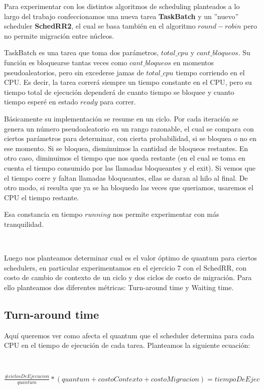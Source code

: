 Para experimentar con los distintos algoritmos de scheduling planteados a lo largo del trabajo confeccionamos una nueva tarea 
\textbf{TaskBatch} y un ''nuevo'' scheduler \textbf{SchedRR2}, el cual se basa también en el algoritmo $round-robin$ pero no permite migración entre núcleos.

TaskBatch es una tarea que toma dos parámetros, $total\_cpu$ y $cant\_bloqueos$. Su función es bloquearse tantas veces como $cant\_bloqueos$ en momentos pseudoaleatorios, pero sin excederse jamas de $total\_cpu$ tiempo corriendo en el CPU. Es decir, la tarea correrá siempre un tiempo constante en el CPU, pero su tiempo total de ejecución dependerá de cuanto tiempo se bloquee y cuanto tiempo esperé en estado $ready$ para correr.

Básicamente su implementación se resume en un ciclo. Por cada iteración se genera un número pseudoaleatorio en un rango razonable, el cual se compara con ciertos parámetros para determinar, con cierta probabilidad, si se bloquea o no en ese momento. Si se bloquea, disminuimos la cantidad de bloqueos restantes. En otro caso, diminuimos el tiempo que nos queda restante (en el cual se toma en cuenta el tiempo consumido por las llamadas bloqueantes y el exit). Si vemos que el tiempo corre y faltan llamadas bloqueantes, ellas se daran al hilo al final. De otro modo, si resulta que ya se ha bloquedo las veces que queriamos, usaremos el CPU el tiempo restante.

Esa constancia en tiempo $running$ nos permite experimentar con más tranquilidad.

~

Luego nos planteamos determinar cual es el valor óptimo de quantum para ciertos schedulers, en particular experimentamos en el ejercicio 7 con el SchedRR, con costo de cambio de contexto de un ciclo y dos ciclos de costo de migración. Para ello planteamos dos diferentes métricas: Turn-around time y Waiting time.

\subsection{Turn-around time}

Aquí queremos ver como afecta el quantum que el scheduler determina para cada CPU en el tiempo de ejecución de cada tarea. Planteamos la siguiente ecuación:

~

$\frac{\#ciclosDeEjecucion}{quantum} * (quantum + costoContexto + costoMigracion) = tiempoDeEjec$

